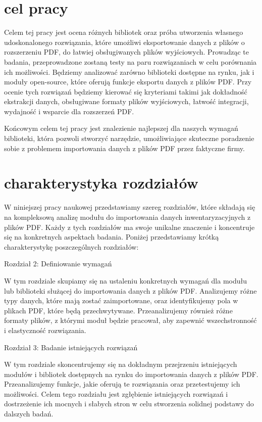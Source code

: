 \documentclass[a4paper,twoside,12pt]{book}
\begin{document}
\section{cel pracy}

Celem tej pracy jest ocena różnych bibliotek oraz próba utworzenia własnego udoskonalonego rozwiązania, które umożliwi eksportowanie danych z plików o rozszerzeniu PDF, do łatwiej obsługiwanych plików wyjściowych. Prowadząc te badania, przeprowadzone zostaną testy na paru rozwiązaniach w celu porównania ich możliwości. Będziemy analizować zarówno biblioteki dostępne na rynku, jak i moduły open-source, które oferują funkcje eksportu danych z plików PDF. Przy ocenie tych rozwiązań będziemy kierować się kryteriami takimi jak dokładność ekstrakcji danych, obsługiwane formaty plików wyjściowych, łatwość integracji, wydajność i wsparcie dla rozszerzeń PDF.

Końcowym celem tej pracy jest znalezienie najlepszej dla naszych wymagań biblioteki, która pozwoli stworzyć narzędzie, umożliwiające skuteczne poradzenie sobie z problemem importowania danych z plików PDF przez faktyczne firmy.

\section{charakterystyka rozdziałów}

W niniejszej pracy naukowej przedstawiamy szereg rozdziałów, które składają się na kompleksową analizę modułu do importowania danych inwentaryzacyjnych z plików PDF. Każdy z tych rozdziałów ma swoje unikalne znaczenie i koncentruje się na konkretnych aspektach badania. Poniżej przedstawiamy krótką charakterystykę poszczególnych rozdziałów:

Rozdział 2: Definiowanie wymagań

W tym rozdziale skupiamy się na ustaleniu konkretnych wymagań dla modułu lub biblioteki służącej do importowania danych z plików PDF.
Analizujemy różne typy danych, które mają zostać zaimportowane, oraz identyfikujemy pola w plikach PDF, które będą przechwytywane.
Przeanalizujemy również różne formaty plików, z którymi moduł będzie pracował, aby zapewnić wszechstronność i elastyczność rozwiązania.

Rozdział 3: Badanie istniejących rozwiązań

W tym rozdziale skoncentrujemy się na dokładnym przejrzeniu istniejących modułów i bibliotek dostępnych na rynku do importowania danych z plików PDF.
Przeanalizujemy funkcje, jakie oferują te rozwiązania oraz przetestujemy ich możliwości. Celem tego rozdziału jest zgłębienie istniejących rozwiązań i dostrzeżenie ich mocnych i słabych stron w celu stworzenia solidnej podstawy do dalszych badań.
\end{document}
